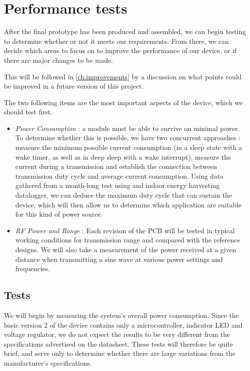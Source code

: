 \chapter{Performance tests}\label{ch:performance} %

After the final prototype has been produced and assembled, we can begin testing
to determine whether or not it meets our requirements. From there, we can decide
which areas to focus on to improve the performance of our device, or if there
are major changes to be made.

This will be followed in \autoref{ch:improvements} by a discussion on what
points could be improved in a future version of this project. 

The two following items are the most important aspects of the device, which we
should test first.

\begin{itemize}
  \item \emph{Power Consumption} : a module must be able to survive on minimal
    power. To determine whether this is possible, we have two concurrent
    approaches : measure the minimum possible current consumption (in a sleep
    state with a wake timer, as well as in deep sleep with a wake interrupt),
    measure the current during a transmission and establish the connection
    between transmission duty cycle and average current consumption. Using data
    gathered from a month-long test using and indoor energy harvesting
    datalogger, we can deduce the maximum duty cycle that can sustain the
    device, which will then allow us to determine which application are suitable
    for this kind of power source.
  \item \emph{RF Power and Range} : Each revision of the PCB will be tested in
    typical working conditions for transmission range and compared with the
    reference designs. We will also take a measurement of the power received at
    a given distance when transmitting a sine wave at various power settings and
    frequencies.
\end{itemize}

\section{Tests}

We will begin by measuring the system's overall power consumption. Since the
basic version 2 of the device contains only a microcontroller, indicator LED and
voltage regulator, we do not expect the results to be very different from the
specifications advertised on the datasheet. These tests will therefore be quite
brief, and serve only to determine whether there are large variations from the
manufacturer's specifications.

